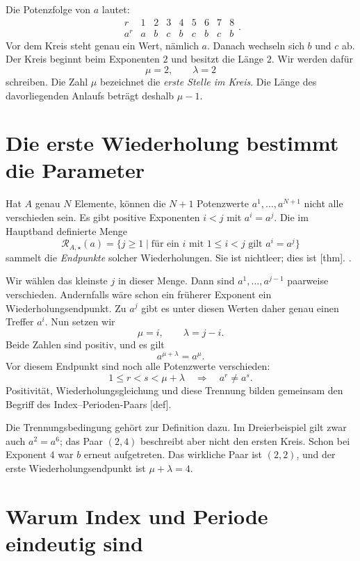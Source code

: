 Die Potenzfolge von \(a\) lautet:
\[
 \begin{array}{c|cccccccc}
 r&1&2&3&4&5&6&7&8\\\hline
 a^r&a&b&c&b&c&b&c&b
 \end{array}.
\]
Vor dem Kreis steht genau ein Wert, nämlich \(a\). Danach wechseln
sich \(b\) und \(c\) ab. Der Kreis beginnt beim Exponenten \(2\)
und besitzt die Länge \(2\). Wir werden dafür
\[
 \mu=2,\qquad\lambda=2
\]
schreiben. Die Zahl \(\mu\) bezeichnet die \emph{erste Stelle im Kreis}.
Die Länge des davorliegenden Anlaufs beträgt deshalb \(\mu-1\).

\section*{Die erste Wiederholung bestimmt die Parameter}

Hat \(A\) genau \(N\) Elemente, können die \(N+1\) Potenzwerte
\(a^1,\ldots,a^{N+1}\) nicht alle verschieden sein. Es gibt
positive Exponenten \(i<j\) mit \(a^i=a^j\).
Die im Hauptband definierte Menge
\[
 \mathcal R_{A,\star}(a)
 =\{j\geq1\mid \text{für ein }i\text{ mit }1\leq i<j
                    \text{ gilt }a^i=a^j\}
\]
sammelt die \emph{Endpunkte} solcher Wiederholungen.
Sie ist nichtleer; dies ist
[thm].
.

Wir wählen das kleinste \(j\) in dieser Menge.
Dann sind \(a^1,\ldots,a^{j-1}\) paarweise verschieden.
Andernfalls wäre schon ein früherer Exponent ein Wiederholungsendpunkt.
Zu \(a^j\) gibt es unter diesen Werten daher genau einen Treffer
\(a^i\). Nun setzen wir
\[
 \mu=i,\qquad\lambda=j-i.
\]
Beide Zahlen sind positiv, und es gilt
\[
 a^{\mu+\lambda}=a^\mu.
\]
Vor diesem Endpunkt sind noch alle Potenzwerte verschieden:
\[
 1\leq r<s<\mu+\lambda\quad\Longrightarrow\quad a^r\ne a^s.
\]
Positivität, Wiederholungsgleichung und diese Trennung bilden gemeinsam
den Begriff des Index--Perioden-Paars
[def].

Die Trennungsbedingung gehört zur Definition dazu. Im Dreierbeispiel
gilt zwar auch \(a^2=a^6\); das Paar \((2,4)\) beschreibt aber nicht
den ersten Kreis. Schon bei Exponent \(4\) war \(b\) erneut aufgetreten.
Das wirkliche Paar ist \((2,2)\), und der erste Wiederholungsendpunkt
ist \(\mu+\lambda=4\).

\section*{Warum Index und Periode eindeutig sind}

